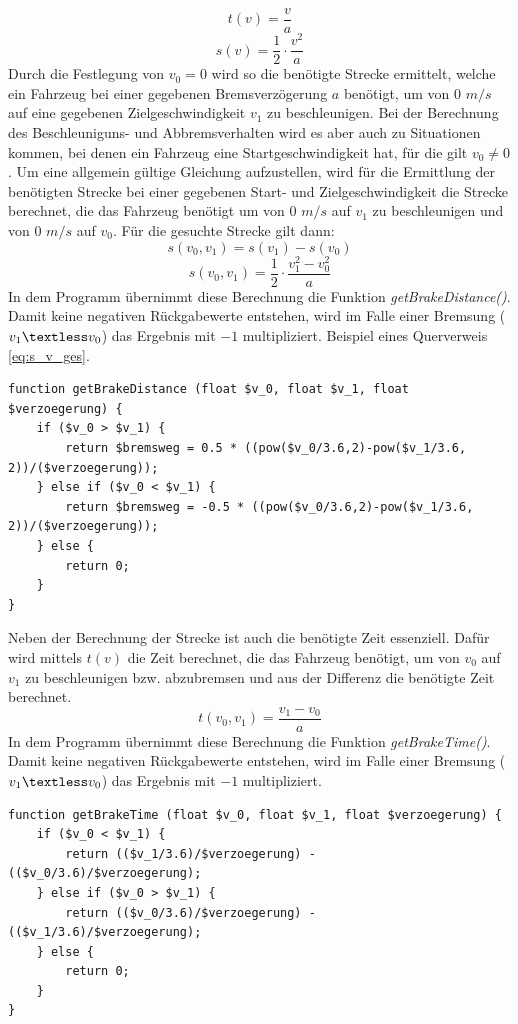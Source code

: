 \begin{equation}
t(v) = \frac{v}{a}
\end{equation}
\begin{equation}
s(v) =\frac{1}{2} \cdot \frac{v^{2}}{a}
\end{equation}
Durch die Festlegung von $v_{0} = 0$ wird so die benötigte Strecke ermittelt, welche ein Fahrzeug bei einer gegebenen Bremsverzögerung $a$ benötigt, um von 0 $m/s$ auf eine gegebenen Zielgeschwindigkeit $v_{1}$ zu beschleunigen. Bei der Berechnung des Beschleuniguns- und Abbremsverhalten wird es aber auch zu Situationen kommen, bei denen ein Fahrzeug eine Startgeschwindigkeit hat, für die gilt $v_{0} \neq 0$. Um eine allgemein gültige Gleichung aufzustellen, wird für die Ermittlung der benötigten Strecke bei einer gegebenen Start- und Zielgeschwindigkeit die Strecke berechnet, die das Fahrzeug benötigt um von 0 $m/s$ auf $v_{1}$ zu beschleunigen und von 0 $m/s$ auf $v_{0}$. Für die gesuchte Strecke gilt dann: 
\begin{equation}
s(v_{0}, v_{1}) = s(v_{1}) - s(v_{0}) 
\end{equation}
\begin{equation}
\label{eq:s_v_ges}
s(v_{0}, v_{1}) =\frac{1}{2} \cdot \frac{v_{1}^{2} - v_{0}^{2}}{a}
\end{equation}
In dem Programm übernimmt diese Berechnung die Funktion \textit{getBrakeDistance()}. Damit keine negativen Rückgabewerte entstehen, wird im Falle einer Bremsung ($v_{1} \textless v_{0}$) das Ergebnis mit $-1$ multipliziert. Beispiel eines Querverweis \eqref{eq:s_v_ges}.
\begin{lstlisting}
function getBrakeDistance (float $v_0, float $v_1, float $verzoegerung) {
	if ($v_0 > $v_1) {
		return $bremsweg = 0.5 * ((pow($v_0/3.6,2)-pow($v_1/3.6, 2))/($verzoegerung));
	} else if ($v_0 < $v_1) {
		return $bremsweg = -0.5 * ((pow($v_0/3.6,2)-pow($v_1/3.6, 2))/($verzoegerung));
	} else {
		return 0;
	}
}
\end{lstlisting}
Neben der Berechnung der Strecke ist auch die benötigte Zeit essenziell. Dafür wird mittels $t(v)$ die Zeit berechnet, die das Fahrzeug benötigt, um von $v_{0}$ auf $v_{1}$ zu beschleunigen bzw. abzubremsen und aus der Differenz die benötigte Zeit berechnet.
\begin{equation}
t(v_{0}, v_{1}) = \frac{v_{1} - v_{0}}{a}
\end{equation}
In dem Programm übernimmt diese Berechnung die Funktion \textit{getBrakeTime()}. Damit keine negativen Rückgabewerte entstehen, wird im Falle einer Bremsung ($v_{1} \textless v_{0}$) das Ergebnis mit $-1$ multipliziert.
\begin{lstlisting}
function getBrakeTime (float $v_0, float $v_1, float $verzoegerung) {
	if ($v_0 < $v_1) {
		return (($v_1/3.6)/$verzoegerung) - (($v_0/3.6)/$verzoegerung);
	} else if ($v_0 > $v_1) {
		return (($v_0/3.6)/$verzoegerung) - (($v_1/3.6)/$verzoegerung);
	} else {
		return 0;
	}
}
\end{lstlisting}

